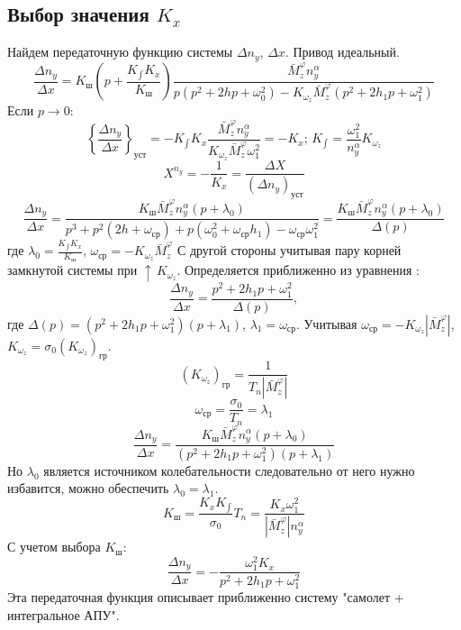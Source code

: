 \documentclass{article}
\begin{document}
\subsection{Выбор значения \texorpdfstring{$K_x$}{Lg}}
Найдем передаточную функцию системы $\Delta n_y$, $\Delta x$. Привод идеальный.
\begin{equation}
	\frac{\Delta n_y}{\Delta x} = K_\text{ш} (p + \frac{K_{\int}
		K_x}{K_\text{ш}}) \frac{\bar{M}_z^{\varphi} n_y^\alpha}{p(p^2 +  2 h p +
	\omega_0^2) - K_{\omega_z} \bar{M}_z^{\varphi} (p^2 + 2h_{1}p +
	\omega_1^2)}
\end{equation}
Если $p \rightarrow 0$:
\[
	\left\{ \frac{\Delta n_y}{\Delta x} \right\}_\text{уст}  = -K_{\int}K_x
	\frac{\bar{M}_z^{\varphi} n_y^\alpha}{K_{\omega_z} \bar{M}_z^{\varphi}
	\omega_1^2} = -K_x; \, K_{\int} = \frac{\omega_1^2}{n_y^\alpha}
	K_{\omega_z}
\]
\[
	X^{n_y} = - \frac{1}{K_x} = \frac{\Delta X}{(\Delta n_y)_\text{уст}}
\]
\[
	\frac{\Delta n_y}{\Delta x} = \frac{K_\text{ш} \bar{M}_z^\varphi
		n_y^\alpha(p + \lambda_0)}{p^3 + p^2 (2h+\omega_\text{ср}) + p (\omega_0^2
		+ \omega_\text{ср} h_1) - \omega_\text{ср} \omega_1^2} = \frac{K_\text{ш}
		\bar{M}_z^\varphi n_y^\alpha(p + \lambda_0)}{\Delta(p)}
\]
где $\lambda_0 = \frac{K_{\int} K_x}{K_\text{ш}}$, $\omega_\text{ср} =
	-K_{\omega_z}\bar{M}_z^\varphi$
С другой стороны учитывая пару корней замкнутой системы при $\uparrow \,
	K_{\omega_z}$. Определяется приближенно из уравнения :
\[
	\frac{\Delta n_y}{\Delta x} = \frac{p^2 + 2 h_1 p + \omega_1^2}{\Delta(p)},
\]
где $\Delta(p) = (p^2 + 2 h_1 p + \omega_1^2)(p + \lambda_1)$, $\lambda_1 =
	\omega_\text{ср}$. Учитывая $\omega_\text{ср} = - K_{\omega_z}
	|\bar{M}_z^\varphi|$, $K_{\omega_z} = \sigma_0 (K_{\omega_z})_\text{гр}$.
\[
	(K_{\omega_z})_\text{гр} = \frac{1}{T_n |\bar{M}_z^\varphi|}
\]
\[
	\omega_\text{ср} = \frac{\sigma_0}{T_n} = \lambda_1
\]
\[
	\frac{\Delta n_y}{\Delta x} = \frac{K_\text{ш} \bar{M}_z^\varphi
		n_y^\alpha(p + \lambda_0)}{(p^2 + 2h_{1} p + \omega_1^2)(p+\lambda_1)}
\]
Но $\lambda_0$ является источником колебательности следовательно от него нужно
избавится, можно обеспечить $\lambda_0 = \lambda_1$.
\[
	K_\text{ш} = \frac{K_{x} K_{\int}}{\sigma_0} T_n = \frac{K_x
		\omega_1^2}{|\bar{M}_z^\varphi| n_y^\alpha}
\]
С учетом выбора $K_\text{ш}$:
\begin{equation}
	\frac{\Delta n_y}{\Delta x} = -\frac{\omega_1^2 K_x}{p^2 + 2 h_1 p +
		\omega_1 ^2}
\end{equation}
Эта передаточная функция описывает приближенно систему "самолет + интегральное
АПУ".
\end{document}
